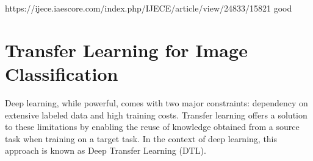 \documentclass[a4paper,12pt]{report}
\begin{document}



https://ijece.iaescore.com/index.php/IJECE/article/view/24833/15821 good


\section*{Transfer Learning for Image Classification}
Deep learning, while powerful, comes with two major constraints: dependency on extensive labeled data and high training costs\citep{iman2022review}. Transfer learning offers a solution to these limitations by enabling the reuse of knowledge obtained from a source task when training on a target task. In the context of deep learning, this approach is known as Deep Transfer Learning (DTL)\citep{iman2022review}.
\end{document}
